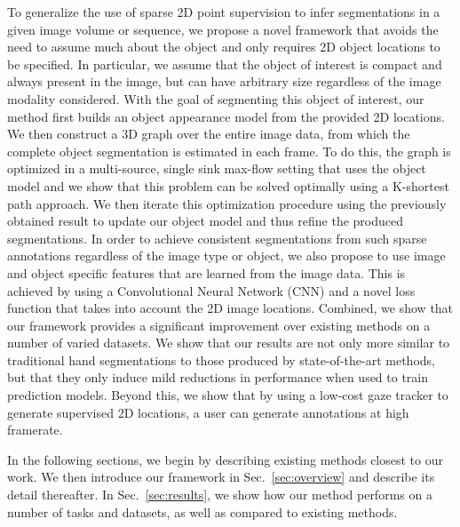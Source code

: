 To generalize the use of sparse 2D point supervision to infer segmentations in a given image volume or sequence, we propose a novel framework that avoids the need to assume much about the object and only requires 2D object locations to be specified. In particular, we assume that the object of interest is compact and always present in the image, but can have arbitrary size regardless of the image modality considered. With the goal of segmenting this object of interest, our method first builds an object appearance model from the provided 2D locations. We then construct a 3D graph over the entire image data, from which the complete object segmentation is estimated in each frame. To do this, the graph is optimized in a multi-source, single sink max-flow setting that uses the object model and we show that this problem can be solved optimally using a K-shortest path approach. We then iterate this optimization procedure using the previously obtained result to update our object model and thus refine the produced segmentations. In order to achieve consistent segmentations from such sparse annotations regardless of the image type or object, we also propose to use image and object specific features that are learned from the image data. This is achieved by using a Convolutional Neural Network (CNN) and a novel loss function that takes into account the 2D image locations. Combined, we show that our framework provides a significant improvement over existing methods on a number of varied datasets. We show that our results are not only more similar to traditional hand segmentations to those produced by state-of-the-art methods, but that they only induce mild reductions in performance when used to train prediction models. Beyond this, we show that by using a low-cost gaze tracker to generate supervised 2D locations, a user can generate annotations at high framerate.


In the following sections, we begin by describing existing methods closest to our work. We then introduce our framework in Sec.~\ref{sec:overview} and describe its detail thereafter. In Sec.~\ref{sec:results}, we show how our method performs on a number of tasks and datasets, as well as compared to existing methods.


